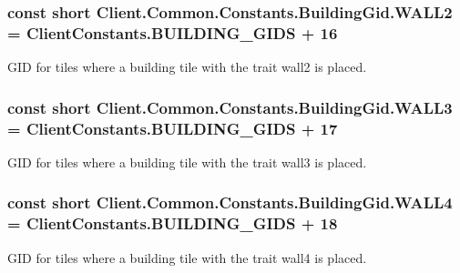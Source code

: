 \subsubsection[{W\+A\+L\+L2}]{\setlength{\rightskip}{0pt plus 5cm}const short Client.\+Common.\+Constants.\+Building\+Gid.\+W\+A\+L\+L2 = {\bf Client\+Constants.\+B\+U\+I\+L\+D\+I\+N\+G\+\_\+\+G\+I\+D\+S} + 16}\label{classClient_1_1Common_1_1Constants_1_1BuildingGid_aa10dd7a207483d0b637866d7efdaca88}


G\+I\+D for tiles where a building tile with the trait wall2 is placed. 

\hypertarget{classClient_1_1Common_1_1Constants_1_1BuildingGid_a696238b51048c5870743cbe50fb58106}{}
\subsubsection[{W\+A\+L\+L3}]{\setlength{\rightskip}{0pt plus 5cm}const short Client.\+Common.\+Constants.\+Building\+Gid.\+W\+A\+L\+L3 = {\bf Client\+Constants.\+B\+U\+I\+L\+D\+I\+N\+G\+\_\+\+G\+I\+D\+S} + 17}\label{classClient_1_1Common_1_1Constants_1_1BuildingGid_a696238b51048c5870743cbe50fb58106}


G\+I\+D for tiles where a building tile with the trait wall3 is placed. 

\hypertarget{classClient_1_1Common_1_1Constants_1_1BuildingGid_ae32db2141c8c89a5f169013d288bbaa6}{}
\subsubsection[{W\+A\+L\+L4}]{\setlength{\rightskip}{0pt plus 5cm}const short Client.\+Common.\+Constants.\+Building\+Gid.\+W\+A\+L\+L4 = {\bf Client\+Constants.\+B\+U\+I\+L\+D\+I\+N\+G\+\_\+\+G\+I\+D\+S} + 18}\label{classClient_1_1Common_1_1Constants_1_1BuildingGid_ae32db2141c8c89a5f169013d288bbaa6}


G\+I\+D for tiles where a building tile with the trait wall4 is placed. 

